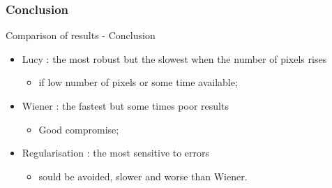 \subsubsection{Conclusion}
\begin{frame}{Comparison of results - Conclusion}
\begin{itemize}
\item Lucy : the most robust but the slowest when the number of pixels rises 
\begin{itemize}
\item if low number of pixels or some time available;
\end{itemize}
\item Wiener : the fastest but some times poor results 
\begin{itemize}
\item Good compromise;
\end{itemize} 
\item Regularisation : the most sensitive to errors 
\begin{itemize}
\item sould be avoided, slower and worse than Wiener.
\end{itemize}
\end{itemize}

\end{frame}
